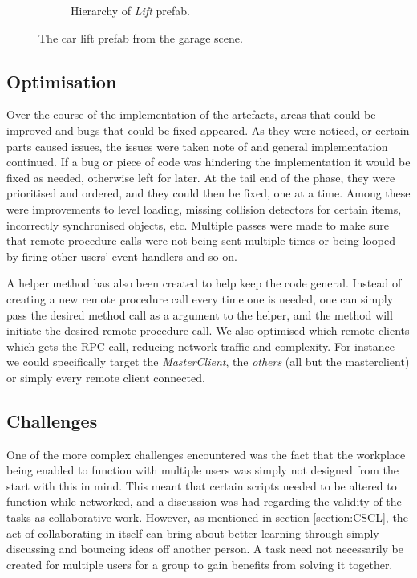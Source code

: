 \begin{figure}[H]
\begin{subfigure}[b]{0.28\textwidth}
    \caption{Hierarchy of \textit{Lift} prefab.}
    \label{fig:carliftTree}
  \end{subfigure}
  \hfill%
  \caption{The car lift prefab from the garage scene.}
  \label{fig:phase2CarLift}
\end{figure}


\subsection{Optimisation} \label{subsec:Optimisation}
Over the course of the implementation of the artefacts, areas that could be improved and bugs that could be fixed appeared. As they were noticed, or certain parts caused issues, the issues were taken note of and general implementation continued. If a bug or piece of code was hindering the implementation it would be fixed as needed, otherwise left for later. At the tail end of the phase, they were prioritised and ordered, and they could then be fixed, one at a time. Among these were improvements to level loading, missing collision detectors for certain items, incorrectly synchronised objects, etc. Multiple passes were made to make sure that remote procedure calls were not being sent multiple times or being looped by firing other users' event handlers and so on. 

A helper method has also been created to help keep the code general. Instead of creating a new remote procedure call every time one is needed, one can simply pass the desired method call as a argument to the helper, and the method will initiate the desired remote procedure call. We also optimised which remote clients which gets the RPC call, reducing network traffic and complexity. For instance we could specifically target the \textit{MasterClient}, the \textit{others} (all but the masterclient) or simply every remote client connected.     



\subsection{Challenges}
One of the more complex challenges encountered was the fact that the workplace being enabled to function with multiple users was simply not designed from the start with this in mind. This meant that certain scripts needed to be altered to function while networked, and a discussion was had regarding the validity of the tasks as collaborative work. However, as mentioned in section \ref{section:CSCL}, the act of collaborating in itself can bring about better learning through simply discussing and bouncing ideas off another person. A task need not necessarily be created for multiple users for a group to gain benefits from solving it together.

